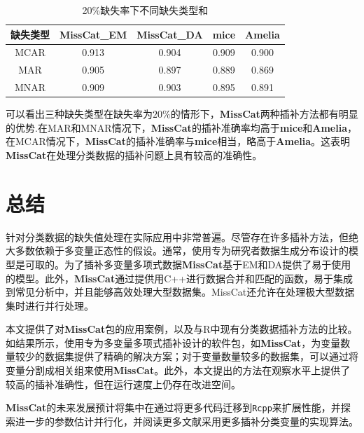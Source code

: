\documentclass[12pt,hyperref,a4paper,UTF8]{ctexart}
\begin{document}
  \begin{table}[ht]
      \caption{20\%缺失率下不同缺失类型和}
      \label{tab:accuracy}
      \centering
      \begin{tabular}{ccccc}
          \toprule %
          缺失类型 & MissCat\_EM & MissCat\_DA&mice & Amelia \\
          \midrule %
           MCAR & 0.913 & 0.904&0.909 & 0.900 \\
           MAR&  0.905& 0.897 &0.889 & 0.869  \\
           MNAR & 0.909 & 0.903 &0.895 & 0.891 \\
          \bottomrule %
      \end{tabular}
      
  \end{table}
  
 可以看出三种缺失类型在缺失率为$20\%$的情形下，\textbf{MissCat}两种插补方法都有明显的优势.在MAR和MNAR情况下，\textbf{MissCat}的插补准确率均高于\textbf{mice}和\textbf{Amelia}，在MCAR情况下，\textbf{MissCat}的插补准确率与\textbf{mice}相当，略高于\textbf{Amelia}。这表明\textbf{MissCat}在处理分类数据的插补问题上具有较高的准确性。
  
  
  \section{总结}
  
  针对分类数据的缺失值处理在实际应用中非常普遍。尽管存在许多插补方法，但绝大多数依赖于多变量正态性的假设。通常，使用专为研究者数据生成分布设计的模型是可取的。为了插补多变量多项式数据\textbf{MissCat}基于EM和DA提供了易于使用的模型。此外，\textbf{MissCat}通过提供用C++进行数据合并和匹配的函数，易于集成到常见分析中，并且能够高效处理大型数据集。MissCat还允许在处理极大型数据集时进行并行处理。
  
  本文提供了对\textbf{MissCat}包的应用案例，以及与R中现有分类数据插补方法的比较。如结果所示，使用专为多变量多项式插补设计的软件包，如\textbf{MissCat}，为变量数量较少的数据集提供了精确的解决方案；对于变量数量较多的数据集，可以通过将变量分割成相关组来使用\textbf{MissCat}。此外，本文提出的方法在观察水平上提供了较高的插补准确性，但在运行速度上仍存在改进空间。
  
  \textbf{MissCat}的未来发展预计将集中在通过将更多代码迁移到\texttt{Rcpp}来扩展性能，并探索进一步的参数估计并行化，并阅读更多文献采用更多插补分类变量的实现算法。
  
\end{document}
